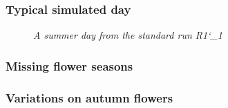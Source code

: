 	\subsubsection{Typical simulated day}
			\begin{figure}
				\centering
				\caption{\textit{A summer day from the standard run R1\char`_1}}
				\label{fig:day158}
			\end{figure}
	 
	\subsubsection{Missing flower seasons}
	\subsubsection{Variations on autumn flowers}
